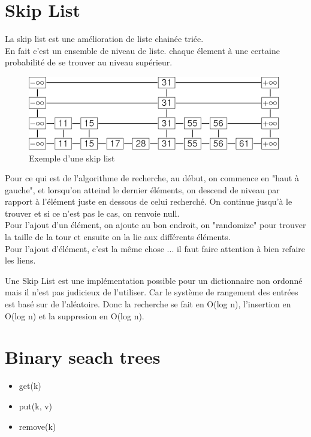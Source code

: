\documentclass[a4paper]{article}
\begin{document}
\section{Skip List}
La skip list est une amélioration de liste chainée triée. \\
En fait c'est un ensemble de niveau de liste. chaque élement à une certaine probabilité de se trouver au niveau supérieur.

\begin{figure}[!h]
\begin{center}
\includegraphics[scale=0.4]{skip-list.png}
\caption{Exemple d'une skip list}
\end{center}
\end{figure}

Pour ce qui est de l'algorithme de recherche, au début, on commence en "haut à gauche", et lorsqu'on atteind le dernier éléments, on descend de niveau par rapport à l'élément juste en dessous de celui recherché.
On continue jusqu'à le trouver et si ce n'est pas le cas, on renvoie null.\\
Pour l'ajout d'un élément, on ajoute au bon endroit, on "randomize" pour trouver la taille de la tour et ensuite on la lie aux différents éléments.\\
Pour l'ajout d'élément, c'est la même chose ... il faut faire attention à bien refaire les liens.

Une Skip List est une implémentation possible pour un dictionnaire non ordonné mais il n'est pas judicieux de l'utiliser. Car le système de rangement des entrées est basé sur de l'aléatoire. Donc la recherche se fait en O(log n), l'insertion en O(log n) et la suppresion en O(log n).

\section{Binary seach trees}
\begin{itemize}
\item get(k)
\item put(k, v)
\item remove(k)
\end{itemize}
\end{document}
